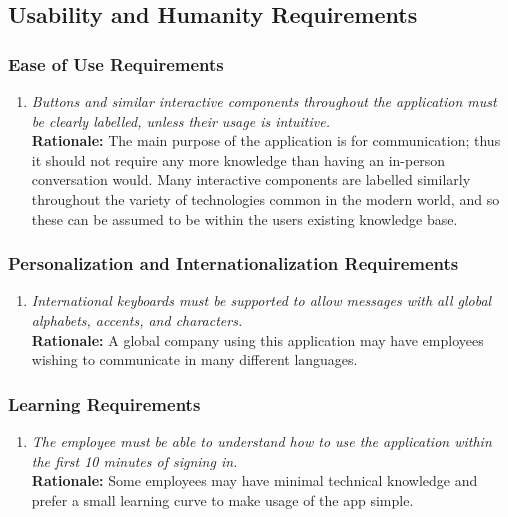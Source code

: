 \documentclass[]{article}
\begin{document}
\begin{enumerate}[{\bf BE1.}]




\subsection{Usability and Humanity Requirements}
\label{sub:usability_and_humanity_requirements}


\subsubsection{Ease of Use Requirements}
\label{ssub:ease_of_use_requirements}
\begin{enumerate}[{UH-EOU}1. ]
    \item \emph{Buttons and similar interactive components throughout the application must be clearly labelled, unless their usage is intuitive.} \\
    {\bf Rationale:} The main purpose of the application is for communication; thus it should not require any more knowledge than having an in-person conversation would. Many interactive components are labelled similarly throughout the variety of technologies common in the modern world, and so these can be assumed to be within the users existing knowledge base.
\end{enumerate}


\subsubsection{Personalization and Internationalization Requirements}
\label{ssub:personalization_and_internationalization_requirements}
\begin{enumerate}[{UH-PI}1. ]
    \item \emph{International keyboards must be supported to allow messages with all global alphabets, accents, and characters.}\\
    {\bf Rationale:} A global company using this application may have employees wishing to communicate in many different languages.
\end{enumerate}


\subsubsection{Learning Requirements}
\label{ssub:learning_requirements}
\begin{enumerate}[{UH-L}1. ]
    \item \emph{The employee must be able to understand how to use the application within the first 10 minutes of signing in.}\\
        {\bf Rationale:} Some employees may have minimal technical knowledge and prefer a small learning curve to make usage of the app simple.
\end{enumerate}





\end{enumerate}
\end{document}
